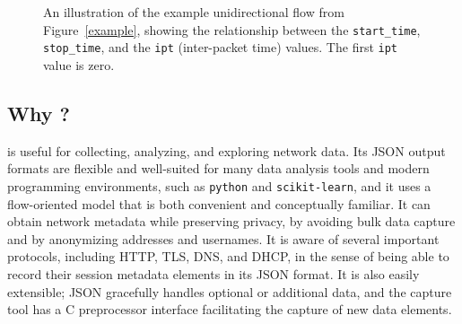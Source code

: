 \documentclass{book}
\begin{document}
\begin{figure}
  \caption{An illustration of the example unidirectional flow from
    Figure~\ref{example}, showing the relationship between the
    \texttt{start\_time}, \texttt{stop\_time}, and the \texttt{ipt}
    (inter-packet time) values.  The first \texttt{ipt} value is
    zero.}
\label{examplefig}
\begin{center}
\end{center}
\end{figure}


\subsection{Why ?}
 is useful for collecting, analyzing, and exploring
network data.  Its JSON output formats are flexible and well-suited
for many data analysis tools and modern programming environments, such
as \texttt{python} and \texttt{scikit-learn}, and it uses a
flow-oriented model that is both convenient and conceptually familiar.
It can obtain network metadata while preserving privacy, by avoiding
bulk data capture and by anonymizing addresses and usernames.  It is
aware of several important protocols, including HTTP, TLS, DNS, and
DHCP, in the sense of being able to record their session metadata
elements in its JSON format.  It is also easily extensible; JSON
gracefully handles optional or additional data, and the capture tool
has a C preprocessor interface facilitating the capture of new data
elements.
\end{document}
